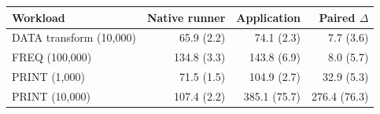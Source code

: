 \begin{tabular}{lrrr}
\toprule
Workload & Native runner & Application & Paired $\Delta$ \\
\midrule
DATA transform (10,000) & 65.9 (2.2) & 74.1 (2.3) & 7.7 (3.6) \\
FREQ (100,000) & 134.8 (3.3) & 143.8 (6.9) & 8.0 (5.7) \\
PRINT (1,000) & 71.5 (1.5) & 104.9 (2.7) & 32.9 (5.3) \\
PRINT (10,000) & 107.4 (2.2) & 385.1 (75.7) & 276.4 (76.3) \\
\bottomrule
\end{tabular}
